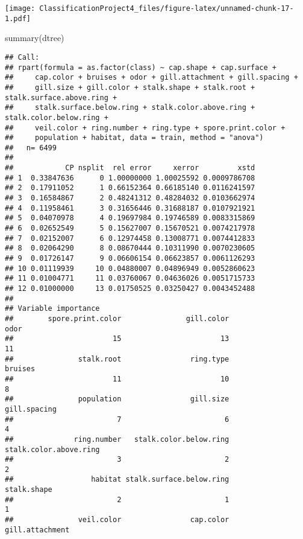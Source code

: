 \documentclass[
]{article}
\newenvironment{Shaded}{\begin{snugshade}}{\end{snugshade}}
\newcommand{\FunctionTok}[1]{\textcolor[rgb]{0.00,0.00,0.00}{#1}}
\newcommand{\NormalTok}[1]{#1}
\begin{document}
\texttt{[image: ClassificationProject4\_files/figure-latex/unnamed-chunk-17-1.pdf]}

\begin{Shaded}
\begin{Highlighting}[]
\FunctionTok{summary}\NormalTok{(dtree)}
\end{Highlighting}
\end{Shaded}

\begin{verbatim}
## Call:
## rpart(formula = as.factor(class) ~ cap.shape + cap.surface + 
##     cap.color + bruises + odor + gill.attachment + gill.spacing + 
##     gill.size + gill.color + stalk.shape + stalk.root + stalk.surface.above.ring + 
##     stalk.surface.below.ring + stalk.color.above.ring + stalk.color.below.ring + 
##     veil.color + ring.number + ring.type + spore.print.color + 
##     population + habitat, data = train, method = "anova")
##   n= 6499 
## 
##            CP nsplit  rel error     xerror         xstd
## 1  0.33847636      0 1.00000000 1.00025592 0.0009786708
## 2  0.17911052      1 0.66152364 0.66185140 0.0116241597
## 3  0.16584867      2 0.48241312 0.48284032 0.0103662974
## 4  0.11958461      3 0.31656446 0.31688187 0.0107921921
## 5  0.04070978      4 0.19697984 0.19746589 0.0083315869
## 6  0.02652549      5 0.15627007 0.15670521 0.0074217978
## 7  0.02152007      6 0.12974458 0.13008771 0.0074412833
## 8  0.02064290      8 0.08670444 0.10311990 0.0070230605
## 9  0.01726147      9 0.06606154 0.06623857 0.0061126293
## 10 0.01119939     10 0.04880007 0.04896949 0.0052860623
## 11 0.01004771     11 0.03760067 0.04636026 0.0051715733
## 12 0.01000000     13 0.01750525 0.03250427 0.0043452488
## 
## Variable importance
##        spore.print.color               gill.color                     odor 
##                       15                       13                       11 
##               stalk.root                ring.type                  bruises 
##                       11                       10                        8 
##               population                gill.size             gill.spacing 
##                        7                        6                        4 
##              ring.number   stalk.color.below.ring   stalk.color.above.ring 
##                        3                        2                        2 
##                  habitat stalk.surface.below.ring              stalk.shape 
##                        2                        1                        1 
##               veil.color                cap.color          gill.attachment 

\end{verbatim}
\end{document}
